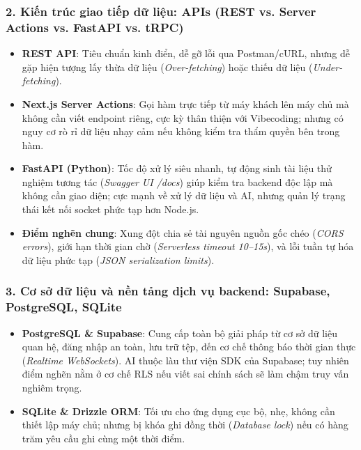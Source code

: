 \documentclass[a4paper,11pt]{article}
\begin{document}
\subsubsection{2. Kiến trúc giao tiếp dữ liệu: APIs (REST vs. Server Actions vs. FastAPI vs. tRPC)}
\begin{itemize}[leftmargin=1.5em]
    \item \textbf{REST API}: Tiêu chuẩn kinh điển, dễ gỡ lỗi qua Postman/cURL, nhưng dễ gặp hiện tượng lấy thừa dữ liệu (\textit{Over-fetching}) hoặc thiếu dữ liệu (\textit{Under-fetching}).
    \item \textbf{Next.js Server Actions}: Gọi hàm trực tiếp từ máy khách lên máy chủ mà không cần viết endpoint riêng, cực kỳ thân thiện với Vibecoding; nhưng có nguy cơ rò rỉ dữ liệu nhạy cảm nếu không kiểm tra thẩm quyền bên trong hàm.
    \item \textbf{FastAPI (Python)}: Tốc độ xử lý siêu nhanh, tự động sinh tài liệu thử nghiệm tương tác (\textit{Swagger UI /docs}) giúp kiểm tra backend độc lập mà không cần giao diện; cực mạnh về xử lý dữ liệu và AI, nhưng quản lý trạng thái kết nối socket phức tạp hơn Node.js.
    \item \textbf{Điểm nghẽn chung}: Xung đột chia sẻ tài nguyên nguồn gốc chéo (\textit{CORS errors}), giới hạn thời gian chờ (\textit{Serverless timeout 10--15s}), và lỗi tuần tự hóa dữ liệu phức tạp (\textit{JSON serialization limits}).
\end{itemize}

\subsubsection{3. Cơ sở dữ liệu và nền tảng dịch vụ backend: Supabase, PostgreSQL, SQLite}
\begin{itemize}[leftmargin=1.5em]
    \item \textbf{PostgreSQL \& Supabase}: Cung cấp toàn bộ giải pháp từ cơ sở dữ liệu quan hệ, đăng nhập an toàn, lưu trữ tệp, đến cơ chế thông báo thời gian thực (\textit{Realtime WebSockets}). AI thuộc làu thư viện SDK của Supabase; tuy nhiên điểm nghẽn nằm ở cơ chế RLS nếu viết sai chính sách sẽ làm chậm truy vấn nghiêm trọng.
    \item \textbf{SQLite \& Drizzle ORM}: Tối ưu cho ứng dụng cục bộ, nhẹ, không cần thiết lập máy chủ; nhưng bị khóa ghi đồng thời (\textit{Database lock}) nếu có hàng trăm yêu cầu ghi cùng một thời điểm.
\end{itemize}
\end{document}
